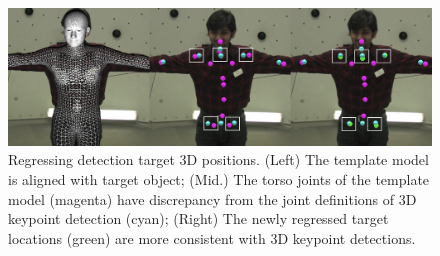 

\begin{figure}[t]    
\centering
	\includegraphics[width=\columnwidth]{tbc_figures/Jointregression_detectionTarget_nospace}    
	\caption{Regressing detection target 3D positions. (Left) The template model is aligned with target object; (Mid.) The torso joints of the template model (magenta) have discrepancy from the joint definitions of 3D keypoint detection (cyan); (Right) The newly regressed target locations (green) are more consistent with 3D keypoint detections.}
	\label{fig:jointRegression}
\end{figure}
%
%


